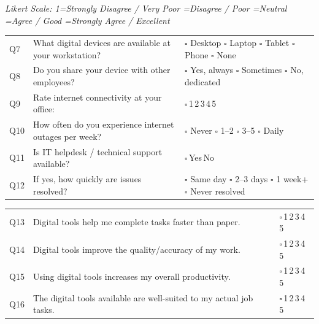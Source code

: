 \documentclass[10pt,a4paper]{article}
\newcommand{\likert}{{\Large$\square$}\,1\quad{\Large$\square$}\,2\quad{\Large$\square$}\,3\quad{\Large$\square$}\,4\quad{\Large$\square$}\,5}
\newcommand{\yesno}{{\Large$\square$}\,Yes\quad{\Large$\square$}\,No}
\begin{document}
\vspace{4pt}
\vspace{4pt}

\small\textit{Likert Scale: 1=Strongly Disagree / Very Poor =Disagree / Poor =Neutral =Agree / Good =Strongly Agree / Excellent}\vspace{3pt}

\noindent\begin{tabularx}{\textwidth}{@{}L{0.5cm} X L{5.5cm}@{}}
Q7 & What digital devices are available at your workstation? & {\Large$\square$} Desktop {\Large$\square$} Laptop {\Large$\square$} Tablet {\Large$\square$} Phone {\Large$\square$} None \\[3pt]
Q8 & Do you share your device with other employees? & {\Large$\square$} Yes, always {\Large$\square$} Sometimes {\Large$\square$} No, dedicated \\[3pt]
Q9 & Rate internet connectivity at your office: & \likert \\[3pt]
Q10 & How often do you experience internet outages per week? & {\Large$\square$} Never {\Large$\square$} 1--2 {\Large$\square$} 3--5 {\Large$\square$} Daily \\[3pt]
Q11 & Is IT helpdesk / technical support available? & \yesno \\[3pt]
Q12 & If yes, how quickly are issues resolved? & {\Large$\square$} Same day {\Large$\square$} 2--3 days {\Large$\square$} 1 week+ {\Large$\square$} Never resolved \\
\end{tabularx}

\vspace{4pt}
\vspace{3pt}

\noindent\begin{tabularx}{\textwidth}{@{}L{0.5cm} X L{5.5cm}@{}}
Q13 & Digital tools help me complete tasks faster than paper. & \likert \\[3pt]
Q14 & Digital tools improve the quality/accuracy of my work. & \likert \\[3pt]
Q15 & Using digital tools increases my overall productivity. & \likert \\[3pt]
Q16 & The digital tools available are well-suited to my actual job tasks. & \likert \\
\end{tabularx}
\end{document}
